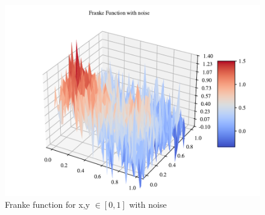 \begin{figure}[h!]
\centering
\includegraphics[width=1\linewidth]{project_1_alt/figures/data/franke_func_noise.pdf}
\caption{Franke function for x,y $\in [0,1]$ with noise }
\label{franke_noise}
\end{figure}



\gaute{}